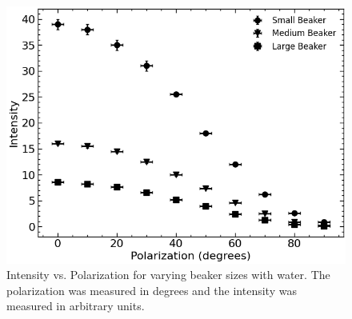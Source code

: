 \begin{figure}[H]
    \begin{center}
        \includegraphics[width=\columnwidth]{../figures/water.png}
    \end{center}
    \caption{Intensity vs. Polarization for varying beaker sizes with water. The polarization was measured in degrees and the intensity was measured in arbitrary units.}
    \label{water_figure}
\end{figure}

